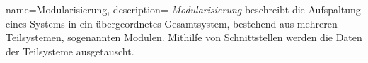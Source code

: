 
%

{
  name=Modularisierung,
  description={
    \textit{Modularisierung} beschreibt die Aufspaltung eines Systems in ein übergeordnetes Gesamtsystem, bestehend aus mehreren Teilsystemen, sogenannten Modulen.
    Mithilfe von Schnittstellen werden die Daten der Teilsysteme ausgetauscht.
  }
}
